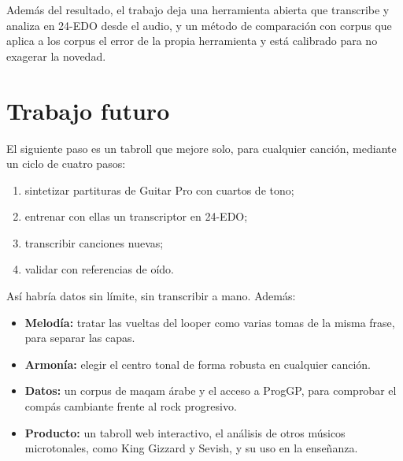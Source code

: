 Además del resultado, el trabajo deja una herramienta abierta que transcribe y analiza en 24-EDO desde el audio, y un
método de comparación con corpus que aplica a los corpus el error de la propia herramienta y está calibrado para no
exagerar la novedad.

\section{Trabajo futuro}

El siguiente paso es un tabroll que mejore solo, para cualquier canción, mediante un ciclo de cuatro pasos:
\begin{enumerate}
  \item sintetizar partituras de Guitar Pro con cuartos de tono;
  \item entrenar con ellas un transcriptor en 24-EDO;
  \item transcribir canciones nuevas;
  \item validar con referencias de oído.
\end{enumerate}
Así habría datos sin límite, sin transcribir a mano. Además:
\begin{itemize}
  \item \textbf{Melodía:} tratar las vueltas del looper como varias tomas de la misma frase, para separar las capas.
  \item \textbf{Armonía:} elegir el centro tonal de forma robusta en cualquier canción.
  \item \textbf{Datos:} un corpus de maqam árabe y el acceso a ProgGP, para comprobar el compás cambiante frente al rock
  progresivo.
  \item \textbf{Producto:} un tabroll web interactivo, el análisis de otros músicos microtonales, como King Gizzard y
  Sevish, y su uso en la enseñanza.
\end{itemize}
